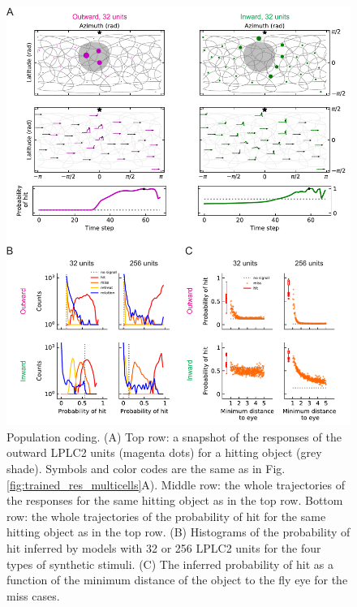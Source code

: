 \documentclass[pdftex,9pt,lineno]{elife}
\begin{document}
\begin{figure}
\label{fig:compare_single}
\end{figure}

\begin{figure}
\includegraphics[width=\linewidth]{figures/compare_outward_inward_multiple_units_paper.pdf}
\caption{Population coding. (A) Top row: a snapshot of the responses of the outward LPLC2 units (magenta dots) for a hitting object (grey shade). Symbols and color codes are the same as in Fig. \ref{fig:trained_res_multicells}A). Middle row: the whole trajectories of the responses for the same hitting object as in the top row. Bottom row: the whole trajectories of the probability of hit for the same hitting object as in the top row. (B) Histograms of the probability of hit inferred by models with 32 or 256 LPLC2 units for the four types of synthetic stimuli. (C) The inferred probability of hit as a function of the minimum distance of the object to the fly eye for the miss cases.}

\end{figure}
\end{document}
